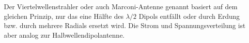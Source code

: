 	Der Viertelwellenstrahler oder auch Marconi-Antenne genannt basiert auf dem gleichen Prinzip, nur das eine Hälfte des $\lambda/2$ Dipols entfällt oder durch Erdung bzw. durch mehrere Radials ersetzt wird. 
	Die Strom und Spannungsverteilung ist aber analog zur Halbwellendipolantenne.


